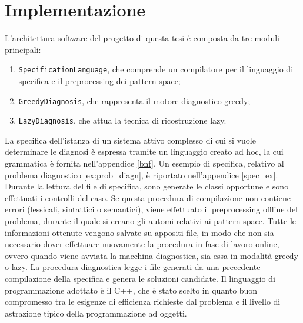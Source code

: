 \chapter{Implementazione}
L'architettura software del progetto di questa tesi è composta da tre moduli principali:
\begin{enumerate}
\item \verb|SpecificationLanguage|, che comprende un compilatore per il linguaggio di specifica e il preprocessing dei pattern space;
\item \verb|GreedyDiagnosis|, che rappresenta il motore diagnostico greedy;
\item \verb|LazyDiagnosis|, che attua la tecnica di ricostruzione lazy.
\end{enumerate}

La specifica dell'istanza di un sistema attivo complesso di cui si vuole determinare le diagnosi è espressa tramite un linguaggio creato ad hoc, la cui grammatica è fornita nell'appendice \ref{bnf}. Un esempio di specifica, relativo al problema diagnostico \ref{ex:prob_diagn}, è riportato nell'appendice \ref{spec_ex}.
Durante la lettura del file di specifica, sono generate le classi opportune e sono effettuati i controlli del caso. Se questa procedura di compilazione non contiene errori (lessicali, sintattici o semantici), viene effettuato il preprocessing offline del problema, durante il quale si creano gli automi relativi ai pattern space. Tutte le informazioni ottenute vengono salvate su appositi file, in modo che non sia necessario dover effettuare nuovamente la procedura in fase di lavoro online, ovvero quando viene avviata la macchina diagnostica, sia essa in modalità greedy o lazy. 
La procedura diagnostica legge i file generati da una precedente compilazione della specifica  e genera le soluzioni candidate. 
Il linguaggio di programmazione adottato è il C++, che è stato scelto in quanto buon compromesso tra le esigenze di efficienza richieste dal problema e il livello di astrazione tipico della programmazione ad oggetti.

